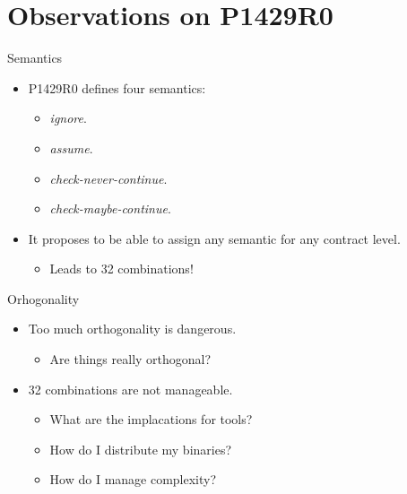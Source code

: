 \section{Observations on P1429R0}

\begin{frame}[t]{Semantics}
\begin{itemize}
  \item P1429R0 defines four semantics:
  \begin{itemize}
    \item \emph{ignore}.
    \item \emph{assume}.
    \item \emph{check-never-continue}.
    \item \emph{check-maybe-continue}. 
  \end{itemize}
  \vfill
  \item It proposes to be able to assign any semantic for any contract level.
    \begin{itemize}
      \item Leads to 32 combinations!
    \end{itemize}
\end{itemize}
\end{frame}

\begin{frame}[t]{Orhogonality}
\begin{itemize}
  \item Too much orthogonality is dangerous.
    \begin{itemize}
      \item Are things really orthogonal?
    \end{itemize}
  \vfill
  \item 32 combinations are not manageable.
    \begin{itemize}
      \item What are the implacations for tools?
      \item How do I distribute my binaries?
      \item How do I manage complexity?
    \end{itemize}
\end{itemize}
\end{frame}

